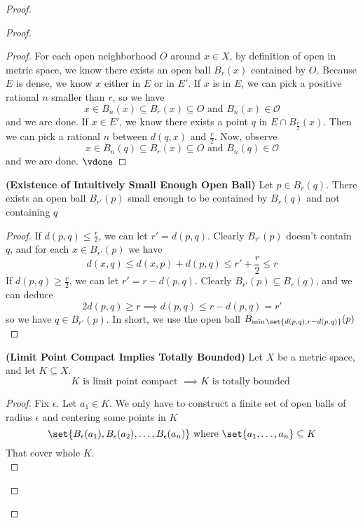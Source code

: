 \documentclass{report}
\begin{document}
\begin{proof}
\begin{proof}
\begin{proof}
For each open neighborhood $O$ around  $x\in X$, by definition of open in metric space, we know there exists an open ball $B_r(x)$ contained by $O$. Because $E$ is dense, we know  $x$ either in $E$ or in  $E'$. If $x$ is in  $E$, we can pick a positive rational  $n$ smaller than  $r$, so we have  
\begin{equation*}
x\in B_n(x)\subseteq B_r(x)\subseteq O\text{ and }B_n(x)\in \mathcal{O} 
\end{equation*}
and we are done. If $x\in E'$, we know there exists a point $q$ in  $E\cap B_{\frac{r}{2}}(x)$. Then we can pick a rational $n$ between $d(q,x)$ and $\frac{r}{2}$. Now, observe
\begin{equation*}
x\in B_n(q)\subseteq B_r(x)\subseteq O\text{ and }B_n(q)\in \mathcal{O}
\end{equation*}
and we are done. $\vdone$
\end{proof}
\begin{lemma}
\label{3.6.2}
\textbf{(Existence of Intuitively Small Enough Open Ball)} Let $p\in  B_r(q)$. There exists an open ball $B_{r'}(p)$ small enough to be contained by $B_r(q)$ and not containing $q$ 
\end{lemma}
\begin{proof}
If $d(p,q)\leq \frac{r}{2}$, we can let $r'=d(p,q)$. Clearly $B_{r'}(p)$ doesn't contain $q$, and for each  $x\in B_{r'}(p)$ we have
\begin{equation*}
d(x,q)\leq d(x,p)+d(p,q)\leq r'+\frac{r}{2}\leq r
\end{equation*}
If $d(p,q)\geq \frac{r}{2}$, we can let $r'=r-d(p,q)$. Clearly $B_{r'}(p)\subseteq B_r(q)$, and we can deduce
\begin{equation*}
2d(p,q)\geq r\implies d(p,q)\leq r-d(p,q)=r'
\end{equation*}
so we have $q\in B_{r'}(p)$. In short, we use the open ball  $B_{\min \set{d(p,q),r-d(p,q)}}(p)$
\end{proof}
\begin{theorem}
\label{3.6.3}
\textbf{(Limit Point Compact Implies Totally Bounded)} Let $X$ be a metric space, and let $K\subseteq X$.
\begin{equation*}
K\text{ is limit point compact }\implies K\text{ is totally bounded }
\end{equation*}
\end{theorem}
\begin{proof}
Fix $\epsilon $. Let $a_1\in K$. We only have to construct a finite set of open balls of radius $\epsilon $ and centering some points in $K$
\begin{equation*}
\set{B_{\epsilon}(a_1),B_{\epsilon }(a_2),\dots ,B_{\epsilon }(a_n)}\text{ where }\set{a_1,\dots ,a_n}\subseteq K
\end{equation*}
That cover whole $K$.\\


\end{proof}
\end{proof}
\end{proof}
\end{document}
